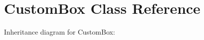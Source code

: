 \hypertarget{classCustomBox}{}\section{Custom\+Box Class Reference}
\label{classCustomBox}


Inheritance diagram for Custom\+Box\+:
